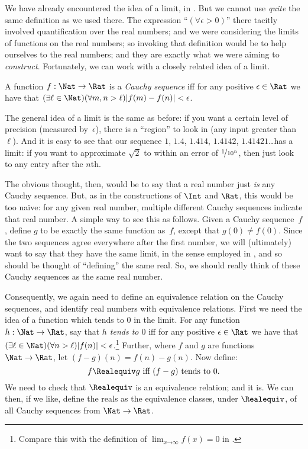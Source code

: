 \documentclass[../../../include/open-logic-section]{subfiles}
\begin{document}
We have already encountered the idea of a limit, in
. But we cannot use \emph{quite} the same
definition as we used there. The expression ``$(\forall \epsilon>0)$''
there tacitly involved quantification over the real numbers; and we
were considering the limits of functions on the real numbers; so
invoking that definition would be to help ourselves to the real
numbers; and they are exactly what we were aiming to \emph{construct}.
Fortunately, we can work with a closely related idea of a limit. 
\begin{defn}
  A function $f: \Nat \to \Rat$ is a \emph{Cauchy sequence} iff for
  any positive $\epsilon \in \Rat$ we have that $(\exists \ell \in
  \Nat)(\forall m, n > \ell)|f(m) - f(n)| < \epsilon$.
\end{defn}

The general idea of a limit is the same as before: if you want a
certain level of precision (measured by~$\epsilon$), there is a
``region'' to look in (any input greater than~$\ell$). And it is easy
to see that our sequence $1$, $1.4$, $1.414$, $1.4142$,
$1.41421$\ldots has a limit: if you want to approximate $\sqrt{2}$ to
within an error of $\nicefrac{1}{10^{n}}$, then just look to any entry
after the $n$th.

The obvious thought, then, would be to say that a real number just
\emph{is} any Cauchy sequence. But, as in the constructions of $\Int$
and $\Rat$, this would be too na\"{i}ve: for any given real number,
multiple different Cauchy sequences indicate that real number. A
simple way to see this as follows. Given a Cauchy sequence~$f$, define
$g$ to be exactly the same function as~$f$, except that $g(0)\neq
f(0)$. Since the two sequences agree everywhere after the first
number, we will (ultimately) want to say that they have the same
limit, in the sense employed in ,
and so should be thought of ``defining'' the same real. So, we should
really think of these Cauchy sequences as the same real number.

Consequently, we again need to define an equivalence relation on the
Cauchy sequences, and identify real numbers with equivalence
relations. First we need the idea of a function which tends to $0$ in
the limit. For any function $h : \Nat \to \Rat$, say that \emph{$h$
tends to $0$} iff for any positive $\epsilon \in \Rat$ we have that
$(\exists \ell \in \Nat)(\forall n > \ell)|f(n)| <
\epsilon$.\footnote{Compare this with the definition of $\lim_{x
\mathord{\rightarrow}\infty}f(x) = 0$ in
.} Further, where $f$ and $g$ are
functions $\Nat \to \Rat$, let $(f-g)(n) = f(n) - g(n)$. Now define:
\[
	f \Realequiv g \text{ iff $(f-g)$ tends to $0$}.
\]
We need to check that $\Realequiv$ is an equivalence relation; and it
is. We can then, if we like, define the reals as the equivalence
classes, under $\Realequiv$, of all Cauchy sequences from $\Nat \to
\Rat$.
\end{document}
